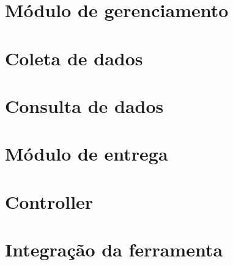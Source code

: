 
\newpage
\section{Módulo de gerenciamento}


\section{Coleta de dados}


\newpage
\section{Consulta de dados}


\newpage
\section{Módulo de entrega}


\newpage
\section{Controller}


\section{Integração da ferramenta}


